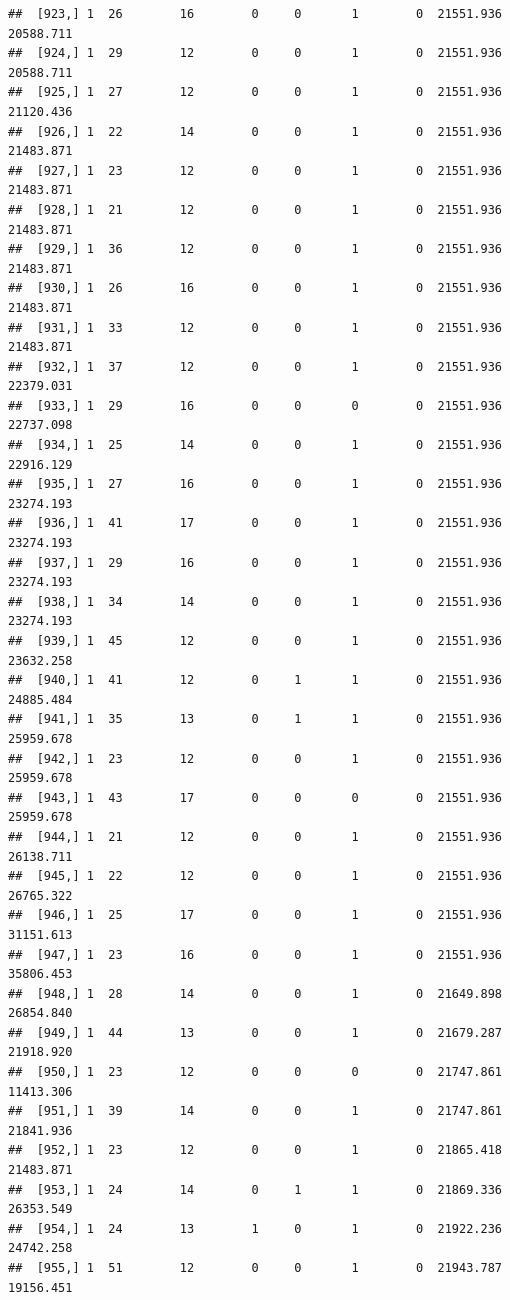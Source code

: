 \documentclass[
]{article}
\begin{document}
\begin{verbatim}
##  [923,] 1  26        16        0     0       1        0  21551.936  20588.711
##  [924,] 1  29        12        0     0       1        0  21551.936  20588.711
##  [925,] 1  27        12        0     0       1        0  21551.936  21120.436
##  [926,] 1  22        14        0     0       1        0  21551.936  21483.871
##  [927,] 1  23        12        0     0       1        0  21551.936  21483.871
##  [928,] 1  21        12        0     0       1        0  21551.936  21483.871
##  [929,] 1  36        12        0     0       1        0  21551.936  21483.871
##  [930,] 1  26        16        0     0       1        0  21551.936  21483.871
##  [931,] 1  33        12        0     0       1        0  21551.936  21483.871
##  [932,] 1  37        12        0     0       1        0  21551.936  22379.031
##  [933,] 1  29        16        0     0       0        0  21551.936  22737.098
##  [934,] 1  25        14        0     0       1        0  21551.936  22916.129
##  [935,] 1  27        16        0     0       1        0  21551.936  23274.193
##  [936,] 1  41        17        0     0       1        0  21551.936  23274.193
##  [937,] 1  29        16        0     0       1        0  21551.936  23274.193
##  [938,] 1  34        14        0     0       1        0  21551.936  23274.193
##  [939,] 1  45        12        0     0       1        0  21551.936  23632.258
##  [940,] 1  41        12        0     1       1        0  21551.936  24885.484
##  [941,] 1  35        13        0     1       1        0  21551.936  25959.678
##  [942,] 1  23        12        0     0       1        0  21551.936  25959.678
##  [943,] 1  43        17        0     0       0        0  21551.936  25959.678
##  [944,] 1  21        12        0     0       1        0  21551.936  26138.711
##  [945,] 1  22        12        0     0       1        0  21551.936  26765.322
##  [946,] 1  25        17        0     0       1        0  21551.936  31151.613
##  [947,] 1  23        16        0     0       1        0  21551.936  35806.453
##  [948,] 1  28        14        0     0       1        0  21649.898  26854.840
##  [949,] 1  44        13        0     0       1        0  21679.287  21918.920
##  [950,] 1  23        12        0     0       0        0  21747.861  11413.306
##  [951,] 1  39        14        0     0       1        0  21747.861  21841.936
##  [952,] 1  23        12        0     0       1        0  21865.418  21483.871
##  [953,] 1  24        14        0     1       1        0  21869.336  26353.549
##  [954,] 1  24        13        1     0       1        0  21922.236  24742.258
##  [955,] 1  51        12        0     0       1        0  21943.787  19156.451

\end{verbatim}
\end{document}
